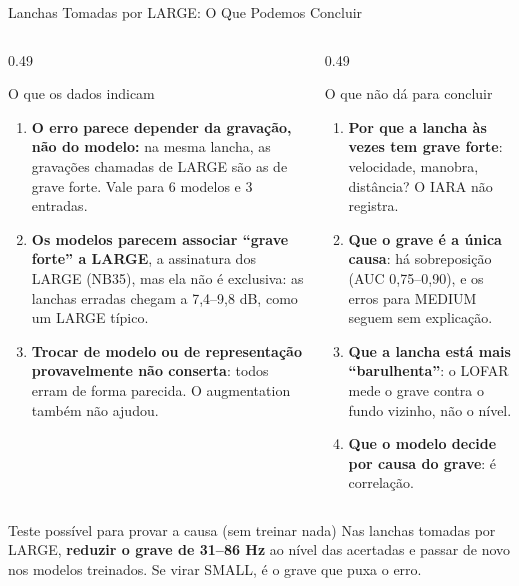 \documentclass[aspectratio=169]{beamer}
\begin{document}
\begin{frame}{Lanchas Tomadas por LARGE: O Que Podemos Concluir}
    \footnotesize
    \begin{columns}[T]
        \begin{column}{0.49\textwidth}
            \begin{block}{\small O que os dados indicam}
                \scriptsize
                \begin{enumerate}
                    \setlength{\itemsep}{2pt}
                    \item \textbf{O erro parece depender da gravação, não do modelo:} na mesma lancha, as gravações chamadas de LARGE são as de grave forte. Vale para 6 modelos e 3 entradas.
                    \item \textbf{Os modelos parecem associar ``grave forte'' a LARGE}, a assinatura dos LARGE (NB35), mas ela não é exclusiva: as lanchas erradas chegam a 7,4--9,8 dB, como um LARGE típico.
                    \item \textbf{Trocar de modelo ou de representação provavelmente não conserta}: todos erram de forma parecida. O augmentation também não ajudou.
                \end{enumerate}
            \end{block}
        \end{column}
        \begin{column}{0.49\textwidth}
            \begin{block}{\small O que não dá para concluir}
                \scriptsize
                \begin{enumerate}
                    \setlength{\itemsep}{2pt}
                    \item \textbf{Por que a lancha às vezes tem grave forte}: velocidade, manobra, distância? O IARA não registra.
                    \item \textbf{Que o grave é a única causa}: há sobreposição (AUC 0,75--0,90), e os erros para MEDIUM seguem sem explicação.
                    \item \textbf{Que a lancha está mais ``barulhenta''}: o LOFAR mede o grave contra o fundo vizinho, não o nível.
                    \item \textbf{Que o modelo decide por causa do grave}: é correlação.
                \end{enumerate}
            \end{block}
        \end{column}
    \end{columns}
    \vspace{0.05cm}
    \begin{alertblock}{\small Teste possível para provar a causa (sem treinar nada)}
        \scriptsize
        Nas lanchas tomadas por LARGE, \textbf{reduzir o grave de 31--86 Hz} ao nível das acertadas e passar de novo nos modelos treinados. Se virar SMALL, é o grave que puxa o erro.
    \end{alertblock}
\end{frame}
\end{document}

